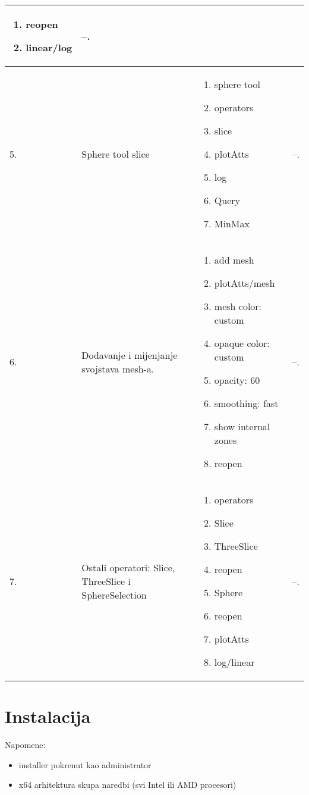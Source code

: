 \documentclass[times, utf8, zavrsni]{fer}
\begin{document}
\begin{longtable}{|l|p{80pt}|p{100pt}|p{120pt}|}
\begin{enumerate}
    \item reopen
    \item linear/log
\end{enumerate}
& --.\\
\hline
5. & Sphere tool slice & \begin{enumerate}
	\item sphere tool    
    \item operators
    \item slice
    \item plotAtts
    \item log
    \item Query
    \item MinMax
\end{enumerate}
& --.\\
\hline
6. & Dodavanje i mijenjanje svojstava mesh-a. & \begin{enumerate}
	\item add mesh
	\item plotAtts/mesh
	\item mesh color: custom
	\item opaque color: custom
	\item opacity: 60%
	\item smoothing: fast
	\item show internal zones
	\item reopen
\end{enumerate}
& --.\\
\hline
7. & Ostali operatori: Slice, ThreeSlice i SphereSelection & \begin{enumerate}
	\item operators
	\item Slice
	\item ThreeSlice
	\item reopen
	\item Sphere
	\item reopen
	\item plotAtts
	\item log/linear
\end{enumerate}
& --.\\
\hline
\end{longtable}
	


\chapter{Instalacija}
Napomene:
\begin{itemize}
	\item installer pokrenut kao administrator
	\item x64 arhitektura skupa naredbi (svi Intel ili AMD procesori)
\end{itemize}
\end{document}
